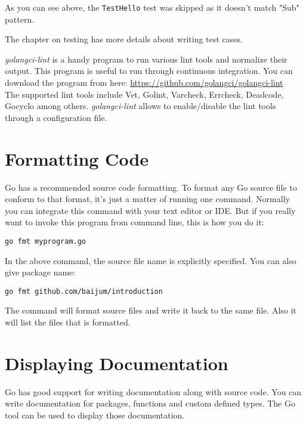 As you can see above, the \texttt{TestHello} test was skipped as it
doesn't match "Sub" pattern.

The chapter on testing has more details about writing test cases.

\textit{golangci-lint} is a handy program to run various lint tools and
normalize their output. This program is useful to run through continuous
integration. You can download the program from here:
\url{https://github.com/golangci/golangci-lint}\\

The supported lint tools include Vet, Golint, Varcheck, Errcheck, Deadcode,
Gocyclo among others. \textit{golangci-lint} allows to enable/disable the lint
tools through a configuration file.

\section{Formatting Code}

Go has a recommended source code formatting.  To
format any Go source file to conform to that format, it's just a
matter of running one command.  Normally you can integrate this
command with your text editor or IDE.  But if you really want to
invoke this program from command line, this is how you do it:

\begin{lstlisting}[numbers=none]
go fmt myprogram.go
\end{lstlisting}

In the above command, the source file name is explicitly specified.
You can also give package name:

\begin{lstlisting}[numbers=none]
go fmt github.com/baijum/introduction
\end{lstlisting}

The command will format source files and write it back to the same
file. Also it will list the files that is formatted.

\section{Displaying Documentation}

Go has good support for writing documentation along with source
code.  You can write documentation for packages,
functions and custom defined types.  The Go tool can be used to
display those documentation.

